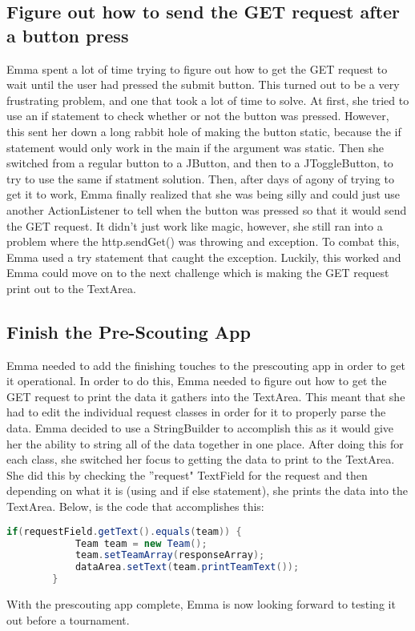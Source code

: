 \documentclass{article}
\begin{document}
\subsection{Figure out how to send the GET request after a button press}
Emma spent a lot of time trying to figure out how to get the GET request to wait until the user had pressed the submit button. This turned out to be a very frustrating problem, and one that took a lot of time to solve. At first, she tried to use an if statement to check whether or not the button was pressed. However, this sent her down a long rabbit hole of making the button static, because the if statement would only work in the main if the argument was static. Then she switched from a regular button to a JButton, and then to a JToggleButton, to try to use the same if statment solution. Then, after days of agony of trying to get it to work, Emma finally realized that she was being silly and could just use another ActionListener to tell when the button was pressed so that it would send the GET request. It didn't just work like magic, however, she still ran into a problem where the http.sendGet() was throwing and exception. To combat this, Emma used a try statement that caught the exception. Luckily, this worked and Emma could move on to the next challenge which is making the GET request print out to the TextArea.

\subsection{Finish the Pre-Scouting App}
Emma needed to add the finishing touches to the prescouting app in order to get it operational. In order to do this, Emma needed to figure out how to get the GET request to print the data it gathers into the TextArea. This meant that she had to edit the individual request classes in order for it to properly parse the data. Emma decided to use a StringBuilder to accomplish this as it would give her the ability to string all of the data together in one place. After doing this for each class, she switched her focus to getting the data to print to the TextArea. She did this by checking the ''request" TextField for the request and then depending on what it is (using and if else statement), she prints the data into the TextArea. Below, is the code that accomplishes this: 

\begin{lstlisting}[language=Java]
       if(requestField.getText().equals(team)) {
            Team team = new Team();
            team.setTeamArray(responseArray);
            dataArea.setText(team.printTeamText());
        } 
\end{lstlisting}

With the prescouting app complete, Emma is now looking forward to testing it out before a tournament. 
\end{document}

